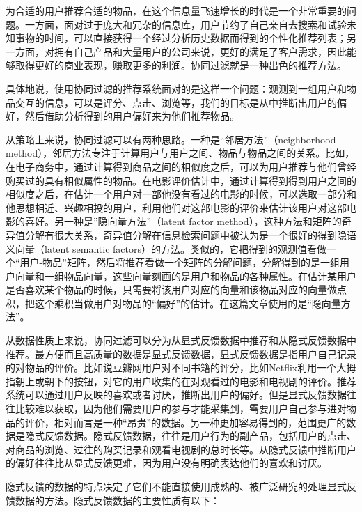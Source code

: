 \documentclass[notitlepage,cs4size,punct,oneside]{ctexrep}
\numberwithin{equation}{chapter}
\theoremstyle{mystyle}
\begin{document}
为合适的用户推荐合适的物品，在这个信息量飞速增长的时代是一个非常重要的问题。一方面，面对过于庞大和冗杂的信息库，用户节约了自己亲自去搜索和试验未知事物的时间，可以直接获得一个经过分析历史数据而得到的个性化推荐列表；另一方面，对拥有自己产品和大量用户的公司来说，更好的满足了客户需求，因此能够取得更好的商业表现，赚取更多的利润。协同过滤就是一种出色的推荐方法。
\par
具体地说，使用协同过滤的推荐系统面对的是这样一个问题：观测到一组用户和物品交互的信息，可以是评分、点击、浏览等，我们的目标是从中推断出用户的偏好，然后借助分析得到的用户偏好来为他们推荐物品。
\par
从策略上来说，协同过滤可以有两种思路。一种是“邻居方法”（neighborhood method），邻居方法专注于计算用户与用户之间、物品与物品之间的关系。比如，在电子商务中，通过计算得到商品之间的相似度之后，可以为用户推荐与他们曾经购买过的具有相似属性的物品。在电影评价估计中，通过计算得到得到用户之间的相似度之后，在估计一个用户对一部他没有看过的电影的时候，可以选取一部分和他思想相近、兴趣相投的用户，利用他们对这部电影的评价来估计该用户对这部电影的喜好。另一种是”隐向量方法”（latent factor method），这种方法和矩阵的奇异值分解有很大关系，奇异值分解在信息检索问题中被认为是一个很好的得到隐语义向量（latent semantic factors）的方法。类似的，它把得到的观测值看做一个“用户-物品”矩阵，然后将推荐看做一个矩阵的分解问题，分解得到的是一组用户向量和一组物品向量，这些向量刻画的是用户和物品的各种属性。在估计某用户是否喜欢某个物品的时候，只需要将该用户对应的向量和该物品对应的向量做点积，把这个乘积当做用户对物品的“偏好”的估计。在这篇文章使用的是“隐向量方法”。
\par
从数据性质上来说，协同过滤可以分为从显式反馈数据中推荐和从隐式反馈数据中推荐。最方便而且高质量的数据是显式反馈数据，显式反馈数据是指用户自己记录的对物品的评价。比如说豆瓣网用户对不同书籍的评分，比如Netflix利用一个大拇指朝上或朝下的按钮，对它的用户收集的在对观看过的电影和电视剧的评价。推荐系统可以通过用户反映的喜欢或者讨厌，推断出用户的偏好。但是显式反馈数据往往比较难以获取，因为他们需要用户的参与才能采集到，需要用户自己参与进对物品的评价，相对而言是一种“昂贵”的数据。另一种更加容易得到的，范围更广的数据是隐式反馈数据。隐式反馈数据，往往是用户行为的副产品，包括用户的点击、对商品的浏览、过往的购买记录和观看电视剧的总时长等。从隐式反馈中推断用户的偏好往往比从显式反馈更难，因为用户没有明确表达他们的喜欢和讨厌。
\par
隐式反馈的数据的特点决定了它们不能直接使用成熟的、被广泛研究的处理显式反馈数据的方法。隐式反馈数据的主要性质有以下：
\end{document}
